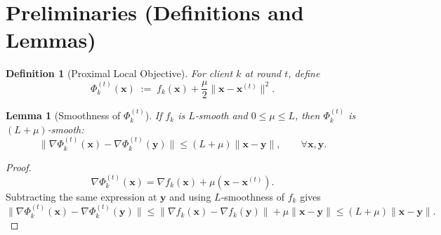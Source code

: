 \documentclass{article}
\newtheorem{lemma}{Lemma}
\newtheorem{definition}{Definition}
\begin{document}
\section*{Preliminaries (Definitions and Lemmas)}
\begin{definition}[Proximal Local Objective]
For client $k$ at round $t$, define
\[
\Phi_{k}^{(t)}(\mathbf{x})\;:=\;f_k(\mathbf{x})+\frac{\mu}{2}\|\mathbf{x}-\mathbf{x}^{(t)}\|^{2}.
\]
\end{definition}
\begin{lemma}[Smoothness of $\Phi_{k}^{(t)}$]\label{lem:smooth-prox}
If $f_k$ is $L$‑smooth and $0\le\mu\le L$, then $\Phi_{k}^{(t)}$ is $(L+\mu)$‑smooth:
\[
\|\nabla\Phi_{k}^{(t)}(\mathbf{x})-\nabla\Phi_{k}^{(t)}(\mathbf{y})\|
\le (L+\mu)\|\mathbf{x}-\mathbf{y}\|,
\qquad\forall\mathbf{x},\mathbf{y}.
\]
\end{lemma}
\begin{proof}
\[
\nabla\Phi_{k}^{(t)}(\mathbf{x})
= \nabla f_k(\mathbf{x})+\mu(\mathbf{x}-\mathbf{x}^{(t)}).
\]
Subtracting the same expression at $\mathbf{y}$ and using $L$‑smoothness of $f_k$ gives
\[
\|\nabla\Phi_{k}^{(t)}(\mathbf{x})-\nabla\Phi_{k}^{(t)}(\mathbf{y})\|
\le \|\nabla f_k(\mathbf{x})-\nabla f_k(\mathbf{y})\|+\mu\|\mathbf{x}-\mathbf{y}\|
\le (L+\mu)\|\mathbf{x}-\mathbf{y}\|.
\tag*{$\square$}
\]
\end{proof}
\end{document}
